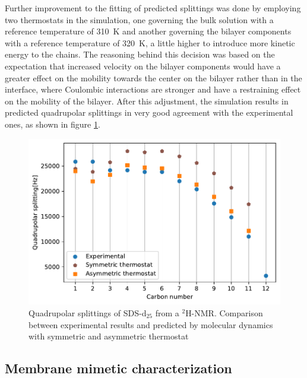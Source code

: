 \documentclass[3p,preprint,review]{elsarticle}
\begin{document}
	Further improvement to the fitting of predicted splittings was done by
	employing
	two thermostats in the simulation, one governing the bulk solution with a
	reference temperature of \SI{310}{K} and another governing the bilayer
	components with a reference temperature of \SI{320}{K}, a little higher to
	introduce more kinetic energy to the chains. The reasoning behind
	this decision was based on the expectation that increased velocity on the
	bilayer components would have a greater effect on the mobility towards the
	center on the bilayer rather than in the interface, where Coulombic
	interactions
	are stronger and have a restraining effect on the mobility of the bilayer.
	After
	this adjustment, the simulation results in predicted quadrupolar splittings in
	very good agreement with the experimental ones, as shown in figure
	\ref{fig:2nd_calibration}.
	
	\begin{figure}[h]
		\centering
		\includegraphics[width=\columnwidth]{calibration2}
		\caption{Quadrupolar splittings of SDS-d$_{25}$ from a $^2$H-NMR. Comparison
			between experimental results and predicted by molecular dynamics with
			symmetric and asymmetric thermostat}
		\label{fig:2nd_calibration}
	\end{figure}
	
	\subsection{Membrane mimetic characterization}
	\label{sec:characterization}
	
\end{document}
